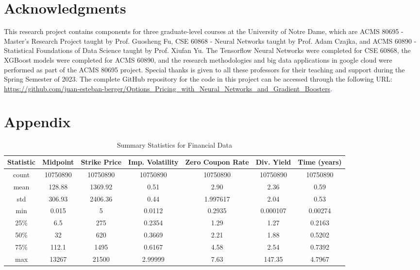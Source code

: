 \documentclass[a4paper]{article}
\begin{document}
\section*{Acknowledgments}

This research project contains components for three graduate-level courses at the University of Notre Dame, which are ACMS 80695 - Master's Research Project taught by Prof. Guosheng Fu, CSE 60868 - Neural Networks taught by Prof. Adam Czajka, and ACMS 60890 - Statistical Foundations of Data Science taught by Prof. Xiufan Yu. The Tensorflow Neural Networks were completed for CSE 60868, the XGBoost models were completed for ACMS 60890, and the research methodologies and big data applications in google cloud were performed as part of the ACMS 80695 project. Special thanks is given to all these professors for their teaching and support during the Spring Semester of 2023. The complete GitHub repository for the code in this project can be accessed through the following URL: \textcolor{blue}{\url{https://github.com/juan-esteban-berger/Options_Pricing_with_Neural_Networks_and_Gradient_Boosters}.}

\printbibliography


\onecolumn %

\appendix
\section{\label{sec:appendix}Appendix}

\begin{table}[htbp]
\centering
\caption{Summary Statistics for Financial Data}
\label{table:financialdata}
\begin{tabular}{ccccccc}
\hline
Statistic & Midpoint & Strike Price & Imp. Volatility & Zero Coupon Rate & Div. Yield & Time (years)\\
\hline
count & \num{10750890} & \num{10750890} & \num{10750890} & \num{10750890} & \num{10750890} & \num{10750890}\\
mean & \num{128.88} & \num{1369.92} & \num{0.51} & \num{2.90} & \num{2.36} & \num{0.59}\\
std & \num{306.93} & \num{2406.36} & \num{0.44} & \num{1.997617} & \num{2.04} & \num{0.53}\\
min & \num{0.015} & \num{5} & \num{0.0112} & \num{0.2935} & \num{0.000107} & \num{0.00274}\\
25\% & \num{6.5} & \num{275} & \num{0.2354} & \num{1.29} & \num{1.27} & \num{0.2163}\\
50\% & \num{32} & \num{620} & \num{0.3669} & \num{2.21} & \num{1.88} & \num{0.5202}\\
75\% & \num{112.1} & \num{1495} & \num{0.6167} & \num{4.58} & \num{2.54} & \num{0.7392}\\
max & \num{13267} & \num{21500} & \num{2.99999} & \num{7.63} & \num{147.35} & \num{4.7967}\\
\hline
\end{tabular}
\end{table}
\end{document}
